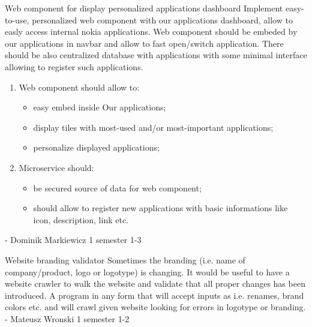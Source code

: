 \begin{project}
{Web component for display personalized applications dashboard}
{Implement easy-to-use, personalized web component with our applications dashboard, allow to easly access internal nokia applications.  Web component should be embeded by our applications in navbar and allow to fast open/switch application. There should be also centralized database with applications with some minimal interface allowing to register such applications.} 
{
\begin{enumerate}
	\item Web component should allow to:
		\begin{itemize}
			\item easy embed inside Our applications;
			\item display tiles with most-used and/or most-important applications;
			\item personalize displayed applications;
		\end{itemize}
	\item Microservice should:
		\begin{itemize}
			\item be secured source of data for web component;
			\item should allow to register new applications with basic informations like icon, description, link etc.
		\end{itemize}
\end{enumerate}
}
{-}
{Dominik Markiewicz}
{1 semester}
{1-3}
\end{project}
\begin{project}
{Website branding validator}
{Sometimes the branding (i.e. name of company/product, logo or logotype) is changing. It would be useful to have a website crawler to walk the website and validate that all proper changes has been introduced.} 
{
A program in any form that will accept inputs as i.e. renames, brand colors etc. and will crawl given website looking for errors in logotype or branding.
}
{-}
{Mateusz Wronski}
{1 semester}
{1-2}
\end{project}
